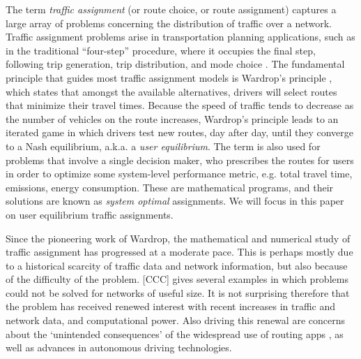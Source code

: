 The term \textit{traffic assignment} (or route choice, or route assignment) captures a large array of problems concerning the distribution of traffic over a network. Traffic assignment problems arise in transportation planning applications, such as in the traditional ``four-step'' procedure, where it occupies the final step, following trip generation, trip distribution, and mode choice \cite{mcnally2007four}.  The fundamental principle that guides most traffic assignment models is Wardrop's principle \cite{wardrop1952some}, which states that amongst the available alternatives, drivers will select routes that minimize their travel times. Because the speed of traffic tends to decrease as the number of vehicles on the route increases, Wardrop's principle leads to an iterated game in which drivers test new routes, day after day, until they converge to a Nash equilibrium, a.k.a. a \textit{user equilibrium}. The term is also used for problems that involve a single decision maker, who prescribes the routes for users in order to optimize some system-level performance metric, e.g. total travel time, emissions, energy consumption. These are mathematical programs, and their solutions are known as \textit{system optimal} assignments. We will focus in this paper on user equilibrium traffic assignments. 

Since the pioneering work of Wardrop, the mathematical and numerical study of traffic assignment has progressed at a moderate pace.  This is perhaps mostly due to a historical scarcity of traffic data and network information, but also because of the difficulty of the problem. [CCC] gives several examples in which problems could not be solved for networks of useful size. It is not surprising therefore that the problem has received renewed interest with recent increases in traffic and network data, and computational power. Also driving this renewal are concerns about the `unintended consequences' of the widespread use of routing apps \cite{traffic_apps}, as well as advances in autonomous driving technologies.

